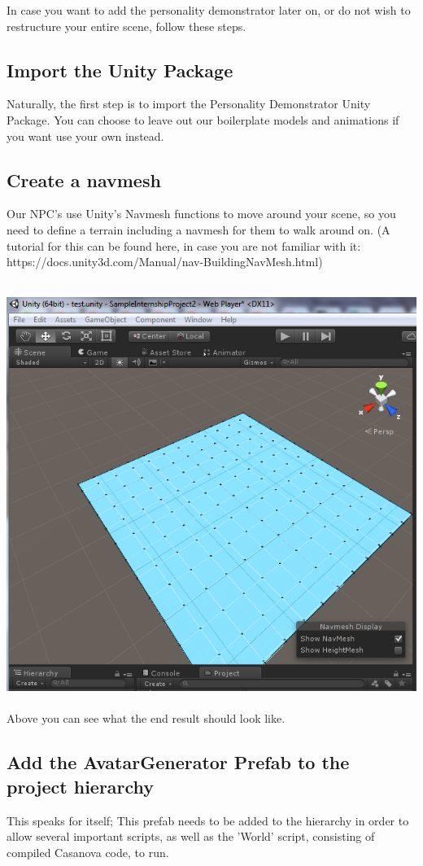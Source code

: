 \documentclass[11pt]{article} %
\begin{document}
In case you want to add the personality demonstrator later on, or do not wish to restructure your entire scene, follow these steps.

\subsection{Import the Unity Package}
Naturally, the first step is to import the Personality Demonstrator Unity Package. %
You can choose to leave out our boilerplate models and animations if you want use your own instead.

\newpage
\subsection{Create a navmesh}
Our NPC's use Unity's Navmesh functions to move around your scene, so you need to define a terrain including a navmesh for them to walk around on. (A tutorial for this can be found here, in case you are not familiar with it: https://docs.unity3d.com/Manual/nav-BuildingNavMesh.html)

~\\
\includegraphics{1}
~\\ 
Above you can see what the end result should look like.

\newpage
\subsection{Add the AvatarGenerator Prefab to the project hierarchy}
This speaks for itself; This prefab needs to be added to the hierarchy in order to allow several important scripts, as well as the 'World' script, consisting of compiled Casanova code, to run.
\end{document}
